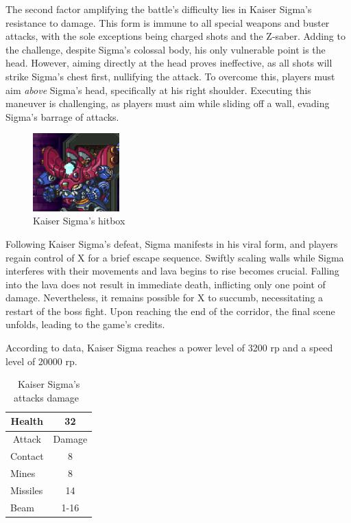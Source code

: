 The second factor amplifying the battle's difficulty lies in Kaiser Sigma's resistance to damage. This form is immune to all special weapons and buster attacks, with the sole exceptions being charged shots and the Z-saber. Adding to the challenge, despite Sigma's colossal body, his only vulnerable point is the head. However, aiming directly at the head proves ineffective, as all shots will strike Sigma's chest first, nullifying the attack. To overcome this, players must aim \emph{above} Sigma's head, specifically at his right shoulder. Executing this maneuver is challenging, as players must aim while sliding off a wall, evading Sigma's barrage of attacks.

\begin{figure}[htp]
	\centering
	\includegraphics[height=3cm]{figures/X3/Doppler_stages/kaiser_hitbox.jpg}
	\caption{Kaiser Sigma's hitbox}
\end{figure}

Following Kaiser Sigma's defeat, Sigma manifests in his viral form, and players regain control of X for a brief escape sequence. Swiftly scaling walls while Sigma interferes with their movements and lava begins to rise becomes crucial. Falling into the lava does not result in immediate death, inflicting only one point of damage. Nevertheless, it remains possible for X to succumb, necessitating a restart of the boss fight. Upon reaching the end of the corridor, the final scene unfolds, leading to the game's credits.


According to data, Kaiser Sigma reaches a power level of 3200 rp and a speed level of 20000 rp.

\begin{table}[htp]
	\centering
	\begin{tabular}[h]{l c}
		\toprule
		\multicolumn{1}{c}{Health}  & 32 \\
		\midrule
		\multicolumn{1}{c}{Attack} & \multicolumn{1}{c}{Damage}\\
		Contact & 8 \\
		Mines& 8\\
		Missiles & 14\\
		Beam& 1-16\\ 
		\bottomrule
	\end{tabular}
	\caption{Kaiser Sigma's attacks damage~\cite{wiki:Sigma3,book:Compendium}}
\end{table}


